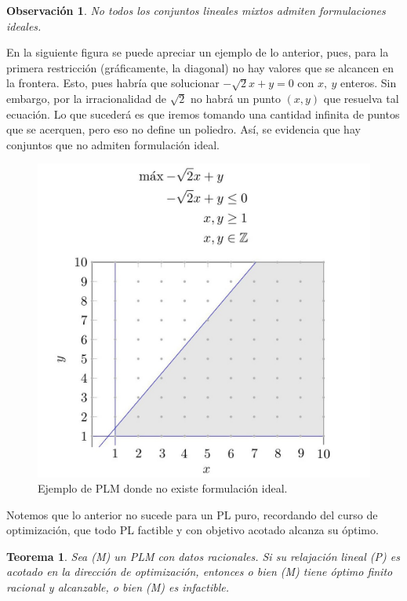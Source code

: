 \documentclass[10pt]{article}
\theoremstyle{plain}
\newtheorem{teo}{Teorema}
\newtheorem{obs}{Observaci\'on}
\theoremstyle{definition}
\begin{document}
\begin{obs}No todos los conjuntos lineales mixtos admiten formulaciones ideales. \end{obs}

En la siguiente figura se puede apreciar un ejemplo de lo anterior, pues, para la primera restricción (gráficamente, la diagonal) no hay valores que se alcancen en la frontera. Esto, pues habría que solucionar $-\sqrt2 x+y=0$ con $x,\ y$ enteros. Sin embargo, por la irracionalidad de $\sqrt2$ no habrá un punto $(x,y)$ que resuelva tal ecuación. Lo que sucederá es que iremos tomando una cantidad infinita de puntos que se acerquen, pero eso no define un poliedro. Así, se evidencia que hay conjuntos que no admiten formulación ideal. 
\begin{figure}[H]
    \centering
    \includegraphics[scale=0.18]{Imagen1.jpg}
    \caption{Ejemplo de PLM donde no existe formulación ideal.}
    \label{fig:NoExistenceIdeal}
\end{figure}

Notemos que lo anterior no sucede para un PL puro, recordando del curso de optimización, que todo PL factible y con objetivo acotado alcanza su óptimo.

\begin{teo}
Sea (\textit{M}) un PLM con datos racionales. Si su relajación lineal (\textit{P}) es acotado en la dirección de optimización, entonces o bien (\textit{M}) tiene óptimo finito racional y alcanzable, o bien (\textit{M}) es infactible.
\end{teo}
\end{document}
